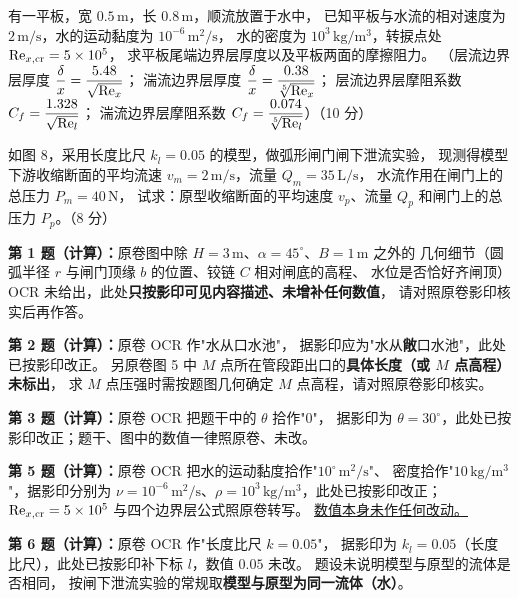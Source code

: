 \begin{ti}
  \item 有一平板，宽 \(0.5\,\mathrm{m}\)，长 \(0.8\,\mathrm{m}\)，顺流放置于水中，
  已知平板与水流的相对速度为 \(2\,\mathrm{m/s}\)，水的运动黏度为 \(10^{-6}\,\mathrm{m^2/s}\)，
  水的密度为 \(10^3\,\mathrm{kg/m^3}\)，转捩点处 \(\mathrm{Re}_{x,\mathrm{cr}}=5\times10^5\)，
  求平板尾端边界层厚度以及平板两面的摩擦阻力。
  （层流边界层厚度 \(\dfrac{\delta}{x}=\dfrac{5.48}{\sqrt{\mathrm{Re}_x}}\)；
  湍流边界层厚度 \(\dfrac{\delta}{x}=\dfrac{0.38}{\sqrt[5]{\mathrm{Re}_x}}\)；
  层流边界层摩阻系数 \(C_f=\dfrac{1.328}{\sqrt{\mathrm{Re}_l}}\)；
  湍流边界层摩阻系数 \(C_f=\dfrac{0.074}{\sqrt[5]{\mathrm{Re}_l}}\)）（10 分）
  \hfill{}

  \item 如图 8，采用长度比尺 \(k_l=0.05\) 的模型，做弧形闸门闸下泄流实验，
  现测得模型下游收缩断面的平均流速 \(v_m=2\,\mathrm{m/s}\)，流量 \(Q_m=35\,\mathrm{L/s}\)，
  水流作用在闸门上的总压力 \(P_m=40\,\mathrm{N}\)，
  试求：原型收缩断面的平均速度 \(v_p\)、流量 \(Q_p\) 和闸门上的总压力 \(P_p\)。（8 分）
  \hfill{}
\end{ti}

\begin{tishi}
\textbf{第 1 题（计算）：}原卷图中除 \(H=3\,\mathrm{m}\)、\(\alpha=45^\circ\)、\(B=1\,\mathrm{m}\) 之外的
几何细节（圆弧半径 \(r\) 与闸门顶缘 \(b\) 的位置、铰链 \(C\) 相对闸底的高程、
水位是否恰好齐闸顶）OCR 未给出，此处\textbf{只按影印可见内容描述、未增补任何数值}，
请对照原卷影印核实后再作答。

\textbf{第 2 题（计算）：}原卷 OCR 作"水从口水池"，
据影印应为"水从\textbf{敞}口水池"，此处已按影印改正。
另原卷图 5 中 \(M\) 点所在管段距出口的\textbf{具体长度（或 \(M\) 点高程）未标出}，
求 \(M\) 点压强时需按题图几何确定 \(M\) 点高程，请对照原卷影印核实。

\textbf{第 3 题（计算）：}原卷 OCR 把题干中的 \(\theta\) 拾作"\(0\)"，
据影印为 \(\theta=30^\circ\)，此处已按影印改正；题干、图中的数值一律照原卷、未改。

\textbf{第 5 题（计算）：}原卷 OCR 把水的运动黏度拾作"\(10^\circ\,\mathrm{m^2/s}\)"、
密度拾作"\(10\,\mathrm{kg/m^3}\)"，据影印分别为
\(\nu=10^{-6}\,\mathrm{m^2/s}\)、\(\rho=10^3\,\mathrm{kg/m^3}\)，此处已按影印改正；
\(\mathrm{Re}_{x,\mathrm{cr}}=5\times10^5\) 与四个边界层公式照原卷转写。
\underline{数值本身未作任何改动。}

\textbf{第 6 题（计算）：}原卷 OCR 作"长度比尺 \(k=0.05\)"，
据影印为 \(k_l=0.05\)（长度比尺），此处已按影印补下标 \(l\)，数值 \(0.05\) 未改。
题设未说明模型与原型的流体是否相同，
按闸下泄流实验的常规取\textbf{模型与原型为同一流体（水）}。
\end{tishi}
